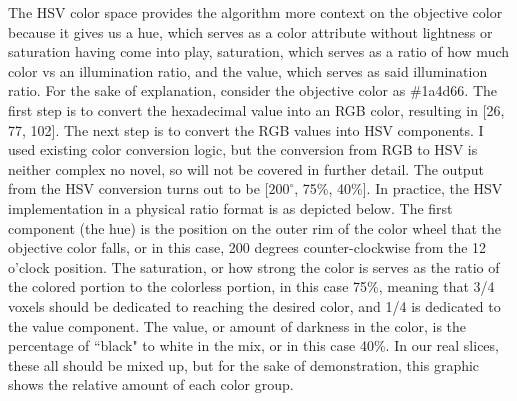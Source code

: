 \documentclass{article}
\begin{document}
\begin{multicols}{2}
The HSV color space provides the algorithm more context on the objective color because it gives us a hue, which serves as a color attribute without lightness or saturation having come into play, saturation, which serves as a ratio of how much color vs an illumination ratio, and the value, which serves as said illumination ratio. For the sake of explanation, consider the objective color as  \#1a4d66. The first step is to convert the hexadecimal value into an RGB color, resulting in [26, 77, 102]. The next step is to convert the RGB values into HSV components. I used existing color conversion logic, but the conversion from RGB to HSV is neither complex no novel, so will not be covered in further detail. The output from the HSV conversion turns out to be [$200^\circ$, 75\%, 40\%]. In practice, the HSV implementation in a physical ratio format is as depicted below. The first component (the hue) is the position on the outer rim of the color wheel that the objective color falls, or in this case, 200 degrees counter-clockwise from the 12 o'clock position. The saturation, or how strong the color is serves as the ratio of the colored portion to the colorless portion, in this case 75\%, meaning that 3/4 voxels should be dedicated to reaching the desired color, and 1/4 is dedicated to the value component. The value, or amount of darkness in the color, is the percentage of ``black" to white in the mix, or in this case 40\%. In our real slices, these all should be mixed up, but for the sake of demonstration, this graphic shows the relative amount of each color group.

\noindent
{} %

\end{multicols}
\end{document}
